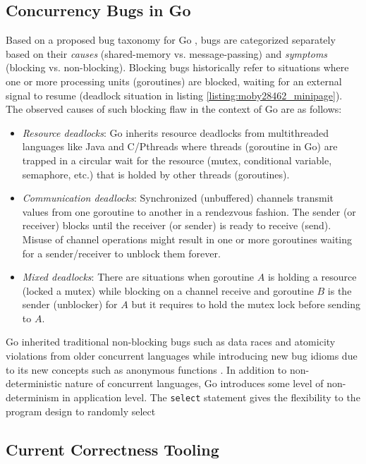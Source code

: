 \subsection{Concurrency Bugs in Go}
\label{sec:goBugs}
Based on a proposed bug taxonomy for Go \cite{tu-concurrentBugs-asplos19}, bugs are categorized separately based on their \textit{causes} (shared-memory vs. message-passing) and \textit{symptoms} (blocking vs. non-blocking).
%
Blocking bugs historically refer to situations where one or more processing units (\eg goroutines) are blocked, waiting for an external signal to resume (\eg deadlock situation in listing \ref{listing:moby28462_minipage}).
%
The observed causes of such blocking flaw in the context of Go are as follows:

\begin{itemize}
  \item \textit{Resource deadlocks}: Go inherits resource deadlocks from multithreaded languages like Java and C/Pthreads where threads (goroutine in Go) are trapped in a circular wait for the resource (\eg mutex, conditional variable, semaphore, etc.) that is holded by other threads (goroutines).
  \item \textit{Communication deadlocks}: Synchronized (unbuffered) channels transmit values from one goroutine to another in a rendezvous fashion. The sender (or receiver) blocks until the receiver (or sender) is ready to receive (send). Misuse of channel operations might result in one or more goroutines waiting for a sender/receiver to unblock them forever.
  \item \textit{Mixed deadlocks}: There are situations when goroutine $A$ is holding a resource (\eg locked a mutex) while blocking on a channel receive and goroutine $B$ is the sender (unblocker) for $A$ but it requires to hold the mutex lock before sending to $A$.
\end{itemize}
Go inherited traditional non-blocking bugs such as data races and atomicity violations from older concurrent languages while introducing new bug idioms due to its new concepts such as anonymous functions \cite{tu-concurrentBugs-asplos19}.
%
In addition to non-deterministic nature of concurrent languages, Go introduces some level of non-determinism in application level.
%
The \texttt{select} statement gives the flexibility to the program design to randomly select 

\subsection{Current Correctness Tooling}

